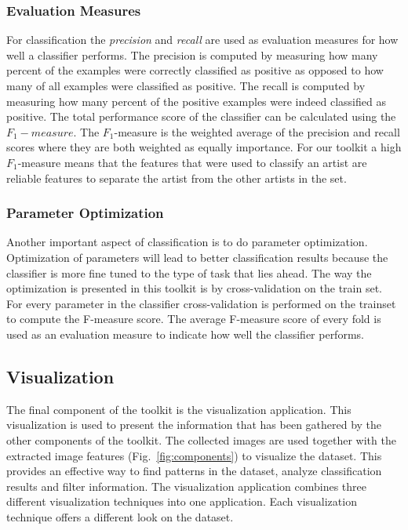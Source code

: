 \subsubsection{Evaluation Measures}
For classification the \textit{precision} and \textit{recall} are used as evaluation measures for how well a classifier performs.
The precision is computed by measuring how many percent of the examples were correctly classified as positive as opposed to how many of all examples were classified as positive.
The recall is computed by measuring how many percent of the positive examples were indeed classified as positive.
The total performance score of the classifier can be calculated using the $F_1-measure$.
The $F_1$-measure is the weighted average of the precision and recall scores where they are both weighted as equally importance.
For our toolkit a high $F_1$-measure means that the features that were used to classify an artist are reliable features to separate the artist from the other artists in the set.

\subsubsection{Parameter Optimization}
Another important aspect of classification is to do parameter optimization. 
Optimization of parameters will lead to better classification results because the classifier is more fine tuned to the type of task that lies ahead. 
The way the optimization is presented in this toolkit is by cross-validation on the train set.
For every parameter in the classifier cross-validation is performed on the trainset to compute the F-measure score.
The average F-measure score of every fold is used as an evaluation measure to indicate how well the classifier performs.


\subsection{Visualization}
The final component of the toolkit is the visualization application.
This visualization is used to present the information that has been gathered by the other components of the toolkit.
The collected images are used together with the extracted image features (Fig.~\ref{fig:components}) to visualize the dataset.
This provides an effective way to find patterns in the dataset, analyze classification results and filter information.
The visualization application combines three different visualization techniques into one application.
Each visualization technique offers a different look on the dataset.

